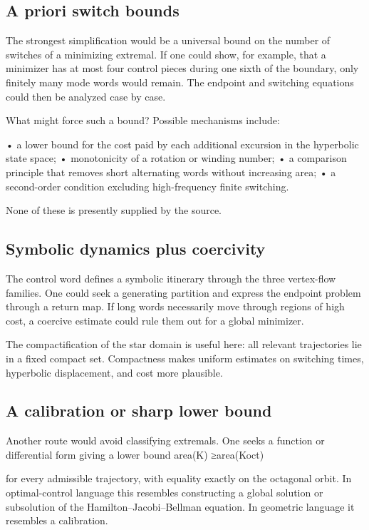 \subsection{A priori switch bounds}

The strongest simplification would be a universal bound on the number of switches of a minimizing extremal. If one could show, for example, that a minimizer has at most four control pieces during one sixth of the boundary, only finitely many mode words would remain. The endpoint and switching equations could then be analyzed case by case.


What might force such a bound? Possible mechanisms include:


• a lower bound for the cost paid by each additional excursion in the hyperbolic state space; • monotonicity of a rotation or winding number; • a comparison principle that removes short alternating words without increasing area; • a second-order condition excluding high-frequency finite switching.


None of these is presently supplied by the source.


\subsection{Symbolic dynamics plus coercivity}

The control word defines a symbolic itinerary through the three vertex-flow families. One could seek a generating partition and express the endpoint problem through a return map. If long words necessarily move through regions of high cost, a coercive estimate could rule them out for a global minimizer.


The compactification of the star domain is useful here: all relevant trajectories lie in a fixed compact set. Compactness makes uniform estimates on switching times, hyperbolic displacement, and cost more plausible.


\subsection{A calibration or sharp lower bound}

Another route would avoid classifying extremals. One seeks a function or differential form giving a lower bound area(K) ≥area(Koct)


for every admissible trajectory, with equality exactly on the octagonal orbit. In optimal-control language this resembles constructing a global solution or subsolution of the Hamilton–Jacobi–Bellman equation. In geometric language it resembles a calibration.


